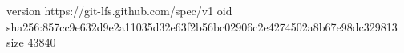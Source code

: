 version https://git-lfs.github.com/spec/v1
oid sha256:857cc9e632d9e2a11035d32e63f2b56bc02906c2e4274502a8b67e98dc329813
size 43840
